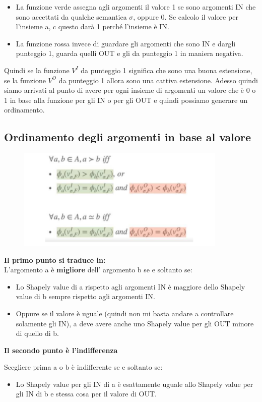     \begin{itemize}
        \item La funzione verde assegna agli argomenti il valore 1 se sono
              argomenti IN che sono accettati da qualche semantica $\sigma$, oppure 0.
              Se calcolo il valore per l'insieme a, c questo darà 1 perché l'insieme è
              IN.
        \item La funzione rossa invece di guardare gli argomenti che sono IN e
              dargli punteggio 1, guarda quelli OUT e gli da punteggio 1 in maniera
              negativa.
    \end{itemize}
    Quindi se la funzione $V^I$ da punteggio 1 significa che sono una buona
    estensione, se la funzione $V^O$ da punteggio 1 allora sono una cattiva
estensione. Adesso quindi siamo arrivati al punto di avere per ogni insieme
di argomenti un valore che è 0 o 1 in base alla funzione per gli IN o per
gli OUT e quindi possiamo generare un ordinamento.
\subsection{Ordinamento degli argomenti in base al valore}
\begin{figure}[htp]
    \centering
    \includegraphics[width=10cm, keepaspectratio]{img/Cap8/ordinamento-valore.png}
\end{figure}
\textbf{Il primo punto si traduce in:}
\\L'argomento a è \textbf{migliore} dell' argomento b se e soltanto se:
\begin{itemize}
    \item Lo Shapely value di a rispetto agli argomenti IN è maggiore dello
          Shapely value di b sempre rispetto agli argomenti IN.
    \item Oppure se il valore è uguale (quindi non mi basta andare a controllare
          solamente gli IN), a deve avere anche uno Shapely value per gli OUT minore
          di quello di b.
\end{itemize}
\begin{center}
    \textbf{Il secondo punto è l'indifferenza}
\end{center}
Scegliere prima a o b è indifferente se e soltanto se:
\begin{itemize}
    \item Lo Shapely value per gli IN di a è esattamente uguale allo Shapely
          value per gli IN di b e stessa cosa per il valore di OUT.
\end{itemize}

